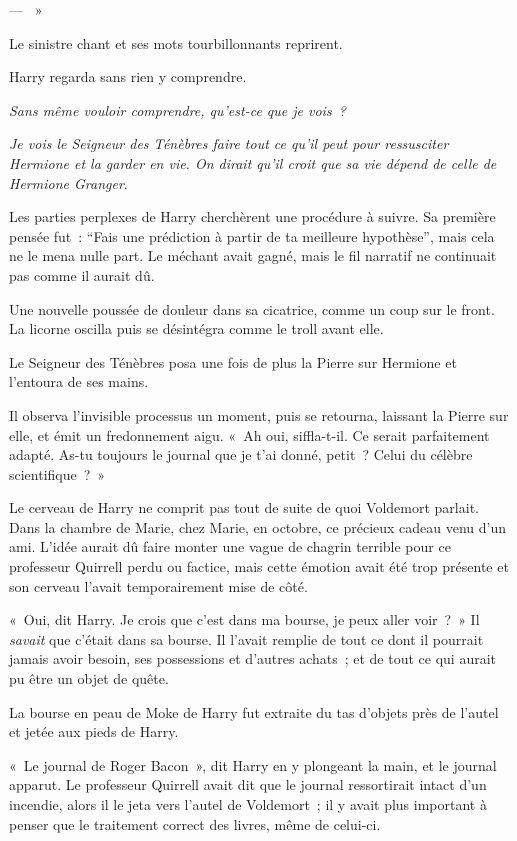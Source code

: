 --- ~»

Le sinistre chant et ses mots tourbillonnants reprirent.

Harry regarda sans rien y comprendre.

\emph{Sans même vouloir comprendre, qu'est-ce que je vois~?}

\emph{Je vois le Seigneur des Ténèbres faire tout ce qu'il peut pour ressusciter Hermione et la garder en vie.
On dirait qu'il croit que sa vie dépend de celle de Hermione Granger}.

Les parties perplexes de Harry cherchèrent une procédure à suivre.
Sa première pensée fut~: “Fais une prédiction à partir de ta meilleure hypothèse”, mais cela ne le mena nulle part.
Le méchant avait gagné, mais le fil narratif ne continuait pas comme il aurait dû.

Une nouvelle poussée de douleur dans sa cicatrice, comme un coup sur le front.
La licorne oscilla puis se désintégra comme le troll avant elle.

Le Seigneur des Ténèbres posa une fois de plus la Pierre sur Hermione et l'entoura de ses mains.

Il observa l'invisible processus un moment, puis se retourna, laissant la Pierre sur elle, et émit un fredonnement aigu.
«~Ah oui, siffla-t-il.
Ce serait parfaitement adapté.
As-tu toujours le journal que je t'ai donné, petit~?
Celui du célèbre scientifique~?~»

Le cerveau de Harry ne comprit pas tout de suite de quoi Voldemort parlait.
Dans la chambre de Marie, chez Marie, en octobre, ce précieux cadeau venu d'un ami.
L'idée aurait dû faire monter une vague de chagrin terrible pour ce professeur Quirrell perdu ou factice, mais cette émotion avait été trop présente et son cerveau l'avait temporairement mise de côté.

«~Oui, dit Harry.
Je crois que c'est dans ma bourse, je peux aller voir~?~»
Il \emph{savait} que c'était dans sa bourse.
Il l'avait remplie de tout ce dont il pourrait jamais avoir besoin, ses possessions et d'autres achats~; et de tout ce qui aurait pu être un objet de quête.

La bourse en peau de Moke de Harry fut extraite du tas d'objets près de l'autel et jetée aux pieds de Harry.

«~Le journal de Roger Bacon~», dit Harry en y plongeant la main, et le journal apparut.
Le professeur Quirrell avait dit que le journal ressortirait intact d'un incendie, alors il le jeta vers l'autel de Voldemort~; il y avait plus important à penser que le traitement correct des livres, même de celui-ci.

